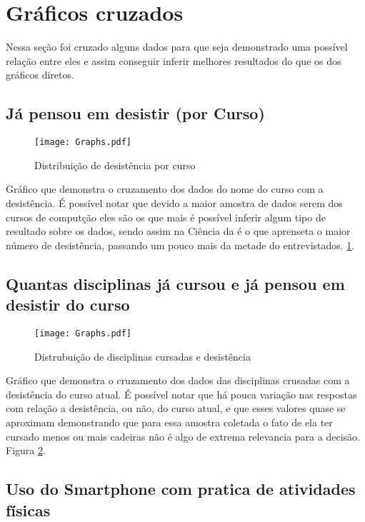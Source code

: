 \documentclass[11pt]{scrartcl} %
\begin{document}
\section{Gráficos cruzados}

Nessa seção foi cruzado alguns dados para que seja demonstrado uma possível relação entre eles e assim conseguir inferir melhores resultados do que os dos gráficos diretos.

\subsection{Já pensou em desistir (por Curso)}

\begin{figure}[h]
  \centering
  \texttt{[image: Graphs.pdf]}
  \label{fig:graph10}
  \caption{Distribuição de desistência por curso}
\end{figure}

Gráfico que demonstra o cruzamento dos dados do nome do curso com a desistência. É possível notar que devido a maior amostra de dados serem dos cursos de computção eles são os que mais é possível inferir algum tipo de resultado sobre os dados, sendo assim na Ciência da é o que aprenseta o maior número de desistência, passando um pouco mais da metade do entrevistados. \ref{fig:graph10}.

\clearpage

\subsection{Quantas disciplinas já cursou e já pensou em desistir do curso}

\begin{figure}[h]
  \centering
  \texttt{[image: Graphs.pdf]}
  \label{fig:graph11}
  \caption{Distrubuição de disciplinas cursadas e desistência}
\end{figure}

Gráfico que demonstra o cruzamento dos dados das disciplinas crusadas com a desistência do curso atual. É possível notar que há pouca variação nas respostas com relação a desistência, ou não, do curso atual, e que esses valores quase se aproximam demonstrando que para essa amostra coletada o fato de ela ter cursado menos ou mais cadeiras não é algo de extrema relevancia para a decisão. Figura \ref{fig:graph11}.

\clearpage

\subsection{Uso do Smartphone com pratica de atividades físicas}
\end{document}
